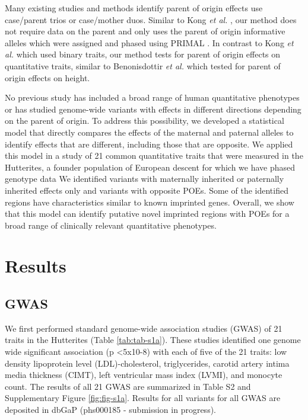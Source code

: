 Many existing studies and methods identify parent of origin effects use case/parent trios or case/mother duos\citep{Chuang:2017kp,Howey:2012hj,Ainsworth:2010bp,Weinberg:1999km,Weinberg:1998cf}. Similar to Kong \emph{et al.} \citep{Kong:2009kk}, our method does not require data on the parent and only uses the parent of origin informative alleles which were assigned and phased using PRIMAL \citep{Livne2015}.  In contrast to Kong \emph{et al.} \citep{Kong:2009kk} which used binary traits, our method tests for parent of origin effects on quantitative traits, similar to Benonisdottir \emph{et al.} \citep{Benonisdottir:2016dz} which tested for parent of origin effects on height.

No previous study has included a broad range of human quantitative phenotypes or has studied genome-wide variants with effects in different directions depending on the parent of origin. To address this possibility, we developed a statistical model that directly compares the effects of the maternal and paternal alleles to identify effects that are different, including those that are opposite. We applied this model in a study of 21 common quantitative traits that were measured in the Hutterites, a founder population of European descent for which we have phased genotype data \citep{Livne2015} We identified variants with maternally inherited or paternally inherited effects only and variants with opposite POEs. Some of the identified regions have characteristics similar to known imprinted genes. Overall, we show that this model can identify putative novel imprinted regions with POEs for a broad range of clinically relevant quantitative phenotypes.

\section{Results}\label{ch02-results}

\subsection{GWAS}\label{GWAS Results}
We first performed standard genome-wide association studies (GWAS) of 21 traits in the Hutterites (Table \ref{tab:tab-s1a}). These studies identified one genome wide significant association (p \textless 5x10-8) with each of five of the 21 traits: low density lipoprotein level (LDL)-cholesterol, triglycerides, carotid artery intima media thickness (CIMT), left ventricular mass index (LVMI), and monocyte count. The results of all 21 GWAS are summarized in Table S2 and Supplementary Figure \ref{fig:fig-s1a}. Results for all variants for all GWAS are deposited in dbGaP (phs000185 - submission in progress).

